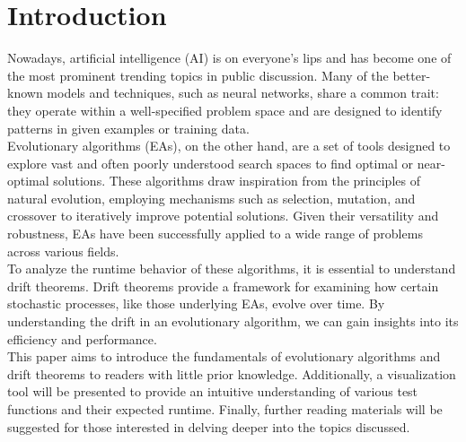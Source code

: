 \section{Introduction}
Nowadays, artificial intelligence (AI) is on everyone's lips and has become one of the most prominent trending topics in public discussion. Many of the better-known models and techniques, such as neural networks, share a common trait: they operate within a well-specified problem space and are designed to identify patterns in given examples or training data.\\
Evolutionary algorithms (EAs), on the other hand, are a set of tools designed to explore vast and often poorly understood search spaces to find optimal or near-optimal solutions. These algorithms draw inspiration from the principles of natural evolution, employing mechanisms such as selection, mutation, and crossover to iteratively improve potential solutions. Given their versatility and robustness, EAs have been successfully applied to a wide range of problems across various fields. \\
To analyze the runtime behavior of these algorithms, it is essential to understand drift theorems. Drift theorems provide a framework for examining how certain stochastic processes, like those underlying EAs, evolve over time. By understanding the drift in an evolutionary algorithm, we can gain insights into its efficiency and performance. \\
This paper aims to introduce the fundamentals of evolutionary algorithms and drift theorems to readers with little prior knowledge. Additionally, a visualization tool will be presented to provide an intuitive understanding of various test functions and their expected runtime. Finally, further reading materials will be suggested for those interested in delving deeper into the topics discussed.

